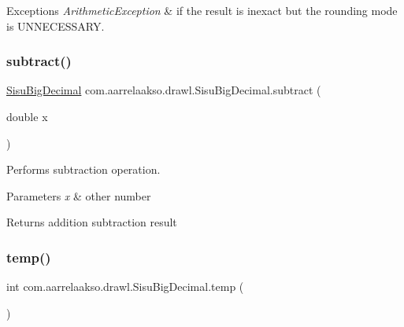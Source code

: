 \begin{DoxyExceptions}{Exceptions}
{\em Arithmetic\+Exception} & if the result is inexact but the rounding mode is U\+N\+N\+E\+C\+E\+S\+S\+A\+RY. \\
\hline
\end{DoxyExceptions}
\mbox{\label{classcom_1_1aarrelaakso_1_1drawl_1_1_sisu_big_decimal_abde4af9e4686abbbdb1539505f7223ae}} 
\subsubsection{\texorpdfstring{subtract()}{subtract()}\hspace{0.1cm}{\footnotesize\ttfamily [3/3]}}
{\footnotesize\ttfamily \hyperlink{classcom_1_1aarrelaakso_1_1drawl_1_1_sisu_big_decimal}{Sisu\+Big\+Decimal} com.\+aarrelaakso.\+drawl.\+Sisu\+Big\+Decimal.\+subtract (\begin{DoxyParamCaption}\item[{double}]{x }\end{DoxyParamCaption})\hspace{0.3cm}{\ttfamily [protected]}}

Performs subtraction operation.


\begin{DoxyParams}{Parameters}
{\em x} & other number \\
\hline
\end{DoxyParams}
\begin{DoxyReturn}{Returns}
addition subtraction result 
\end{DoxyReturn}
\mbox{\label{classcom_1_1aarrelaakso_1_1drawl_1_1_sisu_big_decimal_a17c66373817c4e977bbd7a579246be60}} 
\subsubsection{\texorpdfstring{temp()}{temp()}}
{\footnotesize\ttfamily int com.\+aarrelaakso.\+drawl.\+Sisu\+Big\+Decimal.\+temp (\begin{DoxyParamCaption}{ }\end{DoxyParamCaption})\hspace{0.3cm}{\ttfamily [private]}}

